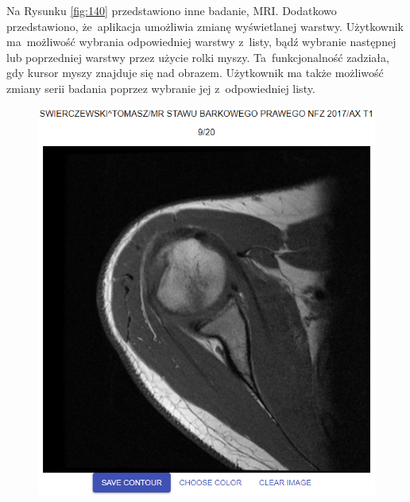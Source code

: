 \documentclass[a4paper,11pt,twoside,openright]{report}
\theoremstyle{definition}
\begin{document}
Na Rysunku \ref{fig:140} przedstawiono inne badanie, MRI. Dodatkowo przedstawiono, 
że~aplikacja umożliwia zmianę wyświetlanej warstwy. Użytkownik ma~możliwość wybrania 
odpowiedniej warstwy z~listy, bądź wybranie następnej lub poprzedniej warstwy przez użycie
rolki myszy. Ta~funkcjonalność zadziała, gdy kursor myszy znajduje się nad obrazem.
Użytkownik ma także możliwość zmiany serii badania poprzez wybranie jej z~odpowiedniej listy.

\bigskip

\begin{figure}[h!]
\begin{center}
	\begin{center}
		\includegraphics[width=1.0\textwidth]{141}
	\end{center}
	\endminipage\hfill
	\begin{center}

\end{center}
\end{center}
\end{figure}
\end{document}
